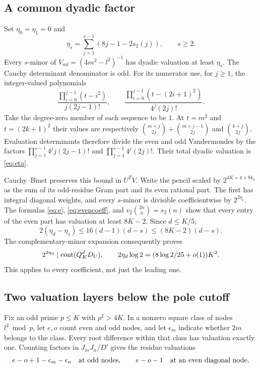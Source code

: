 \subsection{A common dyadic factor}
Set $\eta_0=\eta_1=0$ and
\begin{equation}\label{eq:eta}
 \eta_s=\sum_{j=1}^{s-1}(8j-1-2s_2(j)),\qquad s\geq2.
\end{equation}
Every $s$-minor of $V_{ml}=(4m^2-l^2)^{-1}$ has dyadic valuation
at least $\eta_s$. The Cauchy determinant denominator is odd.
For its numerator use, for $j\geq1$, the integer-valued polynomials
\[
 \frac{\prod_{i=0}^{j-1}(t-i^2)}{j(2j-1)!},\qquad
 \frac{\prod_{i=0}^{j-1}(t-(2i+1)^2)}{4^j(2j)!}.
\]
Take the degree-zero member of each sequence to be $1$.
At $t=m^2$ and $t=(2k+1)^2$ their values are respectively
$\binom{m+j}{2j}+\binom{m+j-1}{2j}$ and $\binom{k+j}{2j}$.
Evaluation determinants therefore divide the even and odd
Vandermondes by the factors
$\prod_{j=1}^{s-1}4^j j(2j-1)!$ and
$\prod_{j=1}^{s-1}4^j(2j)!$.
Their total dyadic valuation is \eqref{eq:eta}.

Cauchy--Binet preserves this bound in $U^TV$. Write the pencil
scaled by $2^{4K+4+8k_2}$ as the sum of its odd-residue Gram part
and its even rational part. The first has integral diagonal weights,
and every $s$-minor is divisible coefficientwise by $2^{2\eta_s}$.
The formulas \eqref{eq:e}, \eqref{eq:evencoeff}, and
$v_2\binom{2n}{n}=s_2(n)$ show that every entry of the even part
has valuation at least $8K-2$. Since $d\leq K/5$,
\[
 2(\eta_d-\eta_s)\leq16(d-1)(d-s)\leq(8K-2)(d-s).
\]
The complementary-minor expansion consequently proves
\begin{equation}\label{eq:dyadiccontent}
 2^{2\eta_d}\mid\operatorname{cont}(Q_K^dD_U),\qquad
 2\eta_d\log2=(8\log2/25+o(1))K^2.
\end{equation}
This applies to every coefficient, not just the leading one.

\subsection{Two valuation layers below the pole cutoff}
Fix an odd prime $p\leq K$ with $p^2>4K$. In a nonzero square
class of nodes $l^2\bmod p$, let $e,o$ count even and odd nodes,
and let $\epsilon_m$ indicate whether $2m$ belongs to the class.
Every root difference within that class has valuation exactly one.
Counting factors in $J_mJ_n/D'$ gives the residue valuations
\begin{equation}\label{eq:classval}
 e-o+1-\epsilon_m-\epsilon_n
 \quad\hbox{at odd nodes},\qquad
 e-o-1\quad\hbox{at an even diagonal node}.
\end{equation}

